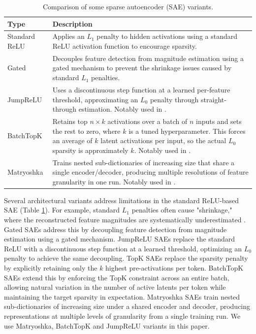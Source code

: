 \begin{table}[t]
\centering
\caption{Comparison of some sparse autoencoder (SAE) variants.}
\label{tab:sae_types}
\begin{tabular}{p{2.5cm}p{12.5cm}}
\toprule
\textbf{Type} & \textbf{Description} \\
\midrule
Standard ReLU \cite{bricken2023monosemanticity}
  & Applies an $L_1$ penalty to hidden activations using a standard ReLU activation function to encourage sparsity. \\
\addlinespace
Gated \cite{rajamanoharan2024improving}
  & Decouples feature detection from magnitude estimation using a gated mechanism to prevent the shrinkage issues caused by standard $L_1$ penalties. \\
\addlinespace
JumpReLU \cite{rajamanoharan2024jumping}
  & Uses a discontinuous step function at a learned per-feature threshold, approximating an $L_0$ penalty through straight-through estimation. Notably used in \cite{lieberum2024gemma}. \\
\addlinespace
BatchTopK \cite{bussmann2024batchtopk}
  & Retains top $n \times k$ activations over a batch of $n$ inputs and sets the rest to zero, where $k$ is a tuned hyperparameter. This forces an average of $k$ latent activations per input, so the actual $L_0$ sparsity is approximately $k$. Notably used in \cite{Brixi2026, karvonen2025saebench}. \\
\addlinespace
Matryoshka \cite{bussmann2025learning}
  & Trains nested sub-dictionaries of increasing size that share a single encoder/decoder, producing multiple resolutions of feature granularity in one run. Notably used in \cite{mcdougall2025gemmascope2}. \\
\bottomrule
\end{tabular}
\end{table}

Several architectural variants address limitations in the standard ReLU-based SAE (Table \ref{tab:sae_types}). For example, standard $L_1$ penalties often cause "shrinkage," where the reconstructed feature magnitudes are systematically underestimated \cite{ferrando2024primer}. Gated SAEs \cite{rajamanoharan2024improving} address this by decoupling feature detection from magnitude estimation using a gated mechanism. JumpReLU SAEs \citep{rajamanoharan2024jumping} replace the standard ReLU with a discontinuous step function at a learned threshold, optimizing an $L_0$ penalty to achieve the same decoupling.
TopK SAEs \citep{gao2024scaling} replace the sparsity penalty by explicitly retaining only the $k$ highest pre-activations per token. BatchTopK SAEs \citep{bussmann2024batchtopk} extend this by enforcing the TopK constraint across an entire batch, allowing natural variation in the number of active latents per token while maintaining the target sparsity in expectation. Matryoshka SAEs \citep{bussmann2025learning} train nested sub-dictionaries of increasing size under a shared encoder and decoder, producing representations at multiple levels of granularity from a single training run. We use Matryoshka, BatchTopK and JumpReLU variants in this paper.

